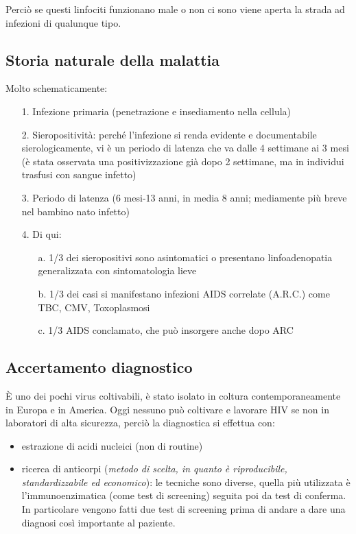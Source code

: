 Perciò se questi linfociti funzionano male o non ci sono viene aperta la
strada ad infezioni di qualunque tipo.

\subsection{Storia naturale della malattia}

Molto schematicamente:

\begin{itemize}

\item[1.]
  Infezione primaria (penetrazione e insediamento nella cellula)
\item[2.]
  Sieropositività: perché l'infezione si renda evidente e documentabile
  sierologicamente, vi è un periodo di latenza che va dalle 4 settimane
  ai 3 mesi (è stata osservata una positivizzazione già dopo 2
  settimane, ma in individui trasfusi con sangue infetto)
\item[3.]
  Periodo di latenza (6 mesi-13 anni, in media 8 anni; mediamente più
  breve nel bambino nato infetto)
\item[4.]
  Di qui:

  \begin{itemize}
  
  \item[a.]
    1/3 dei sieropositivi sono asintomatici o presentano linfoadenopatia
    generalizzata con sintomatologia lieve
  \item[b.]
    1/3 dei casi si manifestano infezioni AIDS correlate (A.R.C.) come
    TBC, CMV, Toxoplasmosi
  \item[c.]
    1/3 AIDS conclamato, che può insorgere anche dopo ARC
  \end{itemize}
\end{itemize}

\subsection{Accertamento diagnostico}

È uno dei pochi virus coltivabili, è stato isolato in coltura
contemporaneamente in Europa e in America. Oggi nessuno può coltivare e
lavorare HIV se non in laboratori di alta sicurezza, perciò la
diagnostica si effettua con:

\begin{itemize}
\item
  estrazione di acidi nucleici (non di routine)
\item
  ricerca di anticorpi (\emph{metodo di scelta, in quanto è
  riproducibile, standardizzabile ed economico}): le tecniche sono
  diverse, quella più utilizzata è l'immunoenzimatica (come test di
  screening) seguita poi da test di conferma. In particolare vengono
  fatti due test di screening prima di andare a dare una diagnosi così
  importante al paziente.
\end{itemize}

